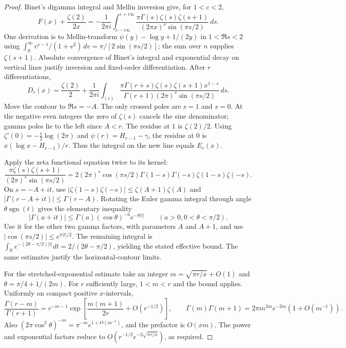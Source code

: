 \begin{proof}
Binet's digamma integral and Mellin inversion give, for $1<c<2$,
\[
 F(x)+\frac{\zeta(2)}{2x}
 =-\frac1{2\pi i}\int_{c-i\infty}^{c+i\infty}
 \frac{\pi\Gamma(s)\zeta(s)\zeta(s+1)}
 {(2\pi x)^s\sin(\pi s/2)}\,ds.
\]
One derivation is to Mellin-transform
$\psi(y)-\log y+1/(2y)$ in $1<\Re s<2$ using
$\int_0^\infty v^{s-1}/(1+v^2)\,dv=\pi/[2\sin(\pi s/2)]$;
the sum over $n$ supplies $\zeta(s+1)$. Absolute convergence of Binet's
integral and exponential decay on vertical lines justify inversion and
fixed-order differentiation. After $r$ differentiations,
\[
 D_r(x)=\frac{\zeta(2)}2+
 \frac1{2\pi i}\int_{(c)}
 \frac{\pi\Gamma(r+s)\zeta(s)\zeta(s+1)x^{1-s}}
 {\Gamma(r+1)(2\pi)^s\sin(\pi s/2)}\,ds.
\]
Move the contour to $\Re s=-A$. The only crossed poles are $s=1$ and
$s=0$. At the negative even integers the zero of $\zeta(s)$ cancels
the sine denominator; gamma poles lie to the left since $A<r$.
The residue at $1$ is $\zeta(2)/2$. Using
$\zeta'(0)=-\tfrac12\log(2\pi)$ and
$\psi(r)=H_{r-1}-\gamma$, the residue at $0$ is
$x(\log x-H_{r-1})/r$.
Thus the integral on the new line equals $E_r(x)$.

Apply the zeta functional equation twice to its kernel:
\[
 \frac{\pi\zeta(s)\zeta(s+1)}
 {(2\pi)^s\sin(\pi s/2)}
 =2(2\pi)^s\cos(\pi s/2)
 \Gamma(1-s)\Gamma(-s)\zeta(1-s)\zeta(-s).
\]
On $s=-A+it$, use
$|\zeta(1-s)\zeta(-s)|\le\zeta(A+1)\zeta(A)$ and
$|\Gamma(r-A+it)|\le\Gamma(r-A)$.
Rotating the Euler gamma integral through angle
$\theta\operatorname{sgn}(t)$ gives the elementary inequality
\[
 |\Gamma(a+it)|\le
 \Gamma(a)(\cos\theta)^{-a}e^{-\theta|t|}
 \qquad(a>0, 0<\theta<\pi/2).
\]
Use it for the other two gamma factors, with parameters $A$ and $A+1$,
and use $|\cos(\pi s/2)|\le e^{\pi|t|/2}$.
The remaining integral is
$\int_{\mathbb R}e^{-(2\theta-\pi/2)|t|}dt
=2/(2\theta-\pi/2)$, yielding the stated effective bound.
The same estimates justify the horizontal-contour limits.

For the stretched-exponential estimate take an integer
$m=\sqrt{\pi r/x}+O(1)$ and $\theta=\pi/4+1/(2m)$.
For $r$ sufficiently large, $1<m<r$ and the bound applies.
Uniformly on compact positive $x$-intervals,
\[
 \frac{\Gamma(r-m)}{\Gamma(r+1)}
 =r^{-m-1}\exp\left[\frac{m(m+1)}{2r}+O(r^{-1/2})\right],
 \qquad
 \Gamma(m)\Gamma(m+1)=2\pi m^{2m}e^{-2m}(1+O(m^{-1})).
\]
Also
$(2\pi\cos^2\theta)^{-m}=\pi^{-m}e^{1+O(m^{-1})}$,
and the prefactor is $O(xm)$. The power and exponential factors reduce
to $O(r^{-1/2}e^{-2\sqrt{\pi r/x}})$, as required.
\end{proof}


